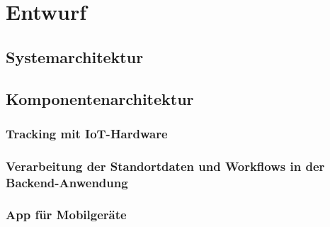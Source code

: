 \chapter{Entwurf}

\section{Systemarchitektur}

\section{Komponentenarchitektur}

\subsection{Tracking mit IoT-Hardware}

\subsection{Verarbeitung der Standortdaten und Workflows in der Backend-Anwendung}

\subsection{App für Mobilgeräte}